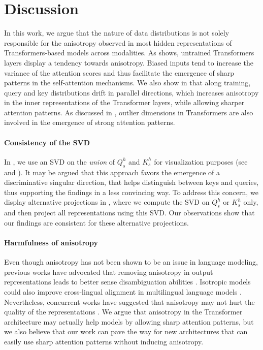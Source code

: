 \section{Discussion}
\label{sec:anisotropy_discussion}

In this work, we argue that the nature of data distributions is not solely responsible for the anisotropy observed in most hidden representations of Transformers-based models across modalities. As  shows, untrained Transformers layers display a tendency towards anisotropy. Biased inputs tend to increase the variance of the attention scores and thus facilitate the emergence of sharp patterns in the self-attention mechanisms. We also show in  that along training, query and key distributions drift in parallel directions, which increases anisotropy in the inner representations of the Transformer layers, while allowing sharper attention patterns. As discussed in \citet{puccetti-etal-2022-outlier}, outlier dimensions in Transformers are also involved in the emergence of strong attention patterns.

\paragraph{Consistency of the SVD} In , we use an SVD on the \textit{union} of $Q^h_s$ and $K^h_s$ for visualization purposes (see  and ). It may be argued that this approach favors the emergence of a discriminative singular direction, that helps distinguish between keys and queries, thus supporting the findings in a less convincing way. To address this concern, we display alternative projections in , where we compute the SVD on $Q^h_s$ or $K^h_s$ only, and then project all representations using this SVD. Our observations show that our findings are consistent for these alternative projections.

\paragraph{Harmfulness of anisotropy} Even though anisotropy has not been shown to be an issue in language modeling, previous works have advocated that removing anisotropy in output representations leads to better sense disambiguation abilities \citep{bihani-rayz-2021-low, bis-etal-2021-much}. Isotropic models could also improve cross-lingual alignment in multilingual language models \citep{hämmerl2023exploring}. Nevertheless, concurrent works have suggested that anisotropy may not hurt the quality of the representations \citep{ait-saada-nadif-2023-anisotropy, rudman2023stable}. We argue that anisotropy in the Transformer architecture may actually help models by allowing sharp attention patterns, but we also believe that our work can pave the way for new architectures that can easily use sharp attention patterns without inducing anisotropy. 


